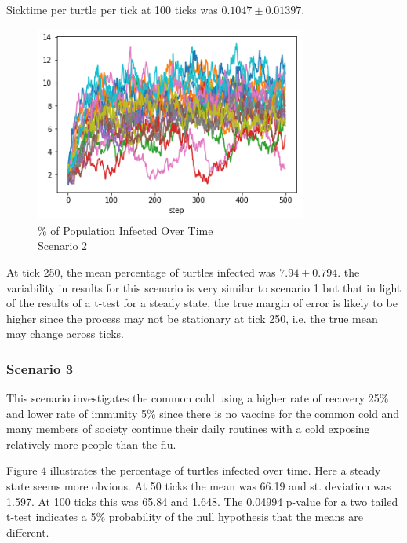 \documentclass[11pt]{article} %
\begin{document}
Sicktime per turtle per tick at 100 ticks was $ 0.1047 \pm 0.01397$.

\begin{figure}
\centering
\includegraphics[width=0.8\textwidth]{20-runs-scenario-2-steady-state}
\caption{\% of Population Infected Over Time \\ Scenario 2}
\end{figure}



At tick 250, the mean percentage of turtles infected was $7.94 \pm 0.794$. the variability in results for this scenario is very similar to scenario 1 but that in light of the results of a t-test for a steady state, the true margin of error is likely to be higher since the process may not be stationary at tick 250, i.e. the true mean may change across ticks.  

\subsubsection{Scenario 3}


This scenario investigates the common cold using a higher rate of recovery 25\% and lower rate of immunity 5\% since there is no vaccine for the common cold and many members of society continue their daily routines with a cold exposing relatively more people than the flu. 


Figure 4 illustrates the percentage of turtles infected over time. Here a steady state seems more obvious. At 50 ticks the mean was 66.19 and st. deviation was 1.597. At 100 ticks this was 65.84 and 1.648. The 0.04994 p-value for a two tailed t-test indicates a 5\% probability of the null hypothesis that the means are different.
\end{document}
